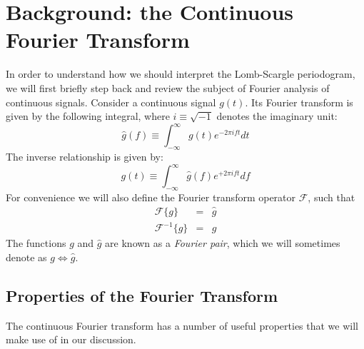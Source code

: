 \documentclass[preprint]{aastex}
\newcommand{\eqlabel}[1]{\label{eq:#1}}
\newcommand{\sectlabel}[1]{\label{sect:#1}}
\begin{document}
\section{Background: the Continuous Fourier Transform}
\sectlabel{continuous-fourier-transform}

In order to understand how we should interpret the Lomb-Scargle periodogram, we will first briefly step back and review the subject of Fourier analysis of continuous signals.
Consider a continuous signal $g(t)$.
Its Fourier transform is given by the following integral, where $i\equiv\sqrt{-1}$ denotes the imaginary unit:
\begin{equation}
    \hat{g}(f) \equiv \int_{-\infty}^\infty g(t) e^{-2\pi i f t} dt
    \eqlabel{FT-def}
\end{equation}
The inverse relationship is given by:
\begin{equation}
    g(t) \equiv \int_{-\infty}^\infty \hat{g}(f) e^{+2\pi i f t} df
    \eqlabel{IFT-def}
\end{equation}
For convenience we will also define the Fourier transform operator
$\mathcal{F}$, such that
\begin{eqnarray}
    \mathcal{F}\{g\} &=& \hat{g} \\
    \mathcal{F}^{-1}\{\hat{g}\} &=& g
\end{eqnarray}
The functions $g$ and $\hat{g}$ are known as a {\it Fourier pair}, which we
will sometimes denote as $g \Longleftrightarrow \hat{g}$.

\subsection{Properties of the Fourier Transform}
\sectlabel{ft-properties}
The continuous Fourier transform has a number of useful properties that we will make use of in our discussion.
\end{document}

